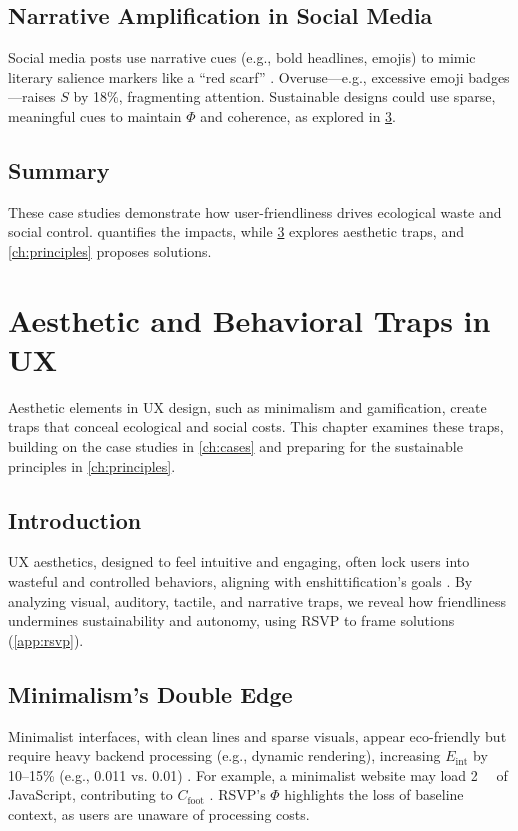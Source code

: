 \documentclass[openany]{book}
\newcommand{\PhiS}{\Phi} %
\newcommand{\Sent}{S} %
\newcommand{\Eint}{E_{\mathrm{int}}} %
\newcommand{\Cfoot}{C_{\mathrm{foot}}} %
\newcommand{\kWh}{\mathrm{kWh}}
\begin{document}
\section{Narrative Amplification in Social Media}
\label{sec:cases-narrative}
Social media posts use narrative cues (e.g., bold headlines, emojis) to mimic literary salience markers like a \enquote{red scarf} \citep{lewis1942}. Overuse—e.g., excessive emoji badges—raises $\Sent$ by 18\%, fragmenting attention. Sustainable designs could use sparse, meaningful cues to maintain $\PhiS$ and coherence, as explored in \cref{ch:aesthetic}.

\section{Summary}
These case studies demonstrate how user-friendliness drives ecological waste and social control.  quantifies the impacts, while \cref{ch:aesthetic} explores aesthetic traps, and \cref{ch:principles} proposes solutions.

\chapter{Aesthetic and Behavioral Traps in UX}
\label{ch:aesthetic}

Aesthetic elements in UX design, such as minimalism and gamification, create traps that conceal ecological and social costs. This chapter examines these traps, building on the case studies in \cref{ch:cases} and preparing for the sustainable principles in \cref{ch:principles}.

\section{Introduction}
\label{sec:aesthetic-intro}
UX aesthetics, designed to feel intuitive and engaging, often lock users into wasteful and controlled behaviors, aligning with enshittification’s goals \citep{doctorow2022}. By analyzing visual, auditory, tactile, and narrative traps, we reveal how friendliness undermines sustainability and autonomy, using RSVP to frame solutions (\cref{app:rsvp}).

\section{Minimalism’s Double Edge}
\label{sec:aesthetic-minimalism}
Minimalist interfaces, with clean lines and sparse visuals, appear eco-friendly but require heavy backend processing (e.g., dynamic rendering), increasing $\Eint$ by 10–15\% (e.g., \SI{0.011}{\kWh} vs. \SI{0.01}{\kWh}) \citep{designlab2024}. For example, a minimalist website may load \SI{2}{\mega\byte} of JavaScript, contributing to $\Cfoot$ \citep{extentia2024}. RSVP’s $\PhiS$ highlights the loss of baseline context, as users are unaware of processing costs.
\end{document}
